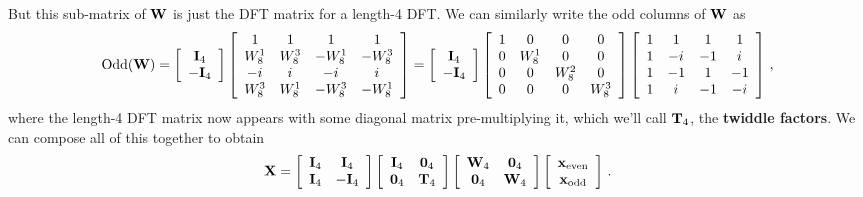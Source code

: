 %
But this sub-matrix of $\mathbf{W}$ is just the DFT matrix for a length-4 DFT.
We can similarly write the odd columns of $\mathbf{W}$ as
\begin{displaymath}
  \mathrm{Odd}(\mathbf{W}) =
  \left[\begin{array}{c}\mathbf{I}_4 \\ -\mathbf{I}_4\end{array}\right]
  \left[\begin{array}{cccc}
      1 & 1 & 1 & 1 \\
      W_8^1 & W_8^3 & -W_8^1 & -W_8^3 \\
      -{i\mkern1mu} & {i\mkern1mu} & -{i\mkern1mu} & {i\mkern1mu} \\
      W_8^3 & W_8^1 & -W_8^3 & -W_8^1
    \end{array}\right] =
  \left[\begin{array}{c}\mathbf{I}_4 \\ -\mathbf{I}_4\end{array}\right]
  \left[\begin{array}{cccc}
      1 & 0 & 0 & 0 \\
      0 & W_8^1 & 0 & 0 \\
      0 & 0 & W_8^2 & 0 \\
      0 & 0 & 0 & W_8^3
    \end{array}\right]
  \left[\begin{array}{cccc}
      1 & 1 & 1 & 1 \\
      1 & -{i\mkern1mu} & -1 & {i\mkern1mu} \\
      1 & -1 & 1 & -1 \\
      1 & {i\mkern1mu} & -1 & -{i\mkern1mu}
    \end{array}\right] \,,  
\end{displaymath}
%
where the length-4 DFT matrix now appears with some diagonal matrix
pre-multiplying it, which we'll call $\mathbf{T}_4$, the
\textbf{twiddle factors}. We can compose all of this together to obtain
%
\begin{displaymath}
  \mathbf{X} = \left[\begin{array}{cc}
      \mathbf{I}_4 & \mathbf{I}_4 \\
      \mathbf{I}_4 & -\mathbf{I}_4
    \end{array}\right]
  \left[\begin{array}{cc}
      \mathbf{I}_4 & \mathbf{0}_4 \\
      \mathbf{0}_4 & \mathbf{T}_4
    \end{array}\right] 
  \left[\begin{array}{cc}
      \mathbf{W}_4 & \mathbf{0}_4 \\
      \mathbf{0}_4 & \mathbf{W}_4
    \end{array}\right]
  \left[\begin{array}{c}
      \mathbf{x}_{\mathrm{even}} \\ \mathbf{x}_{\mathrm{odd}}
    \end{array}\right] \,.
\end{displaymath}
